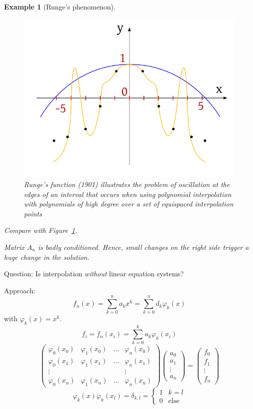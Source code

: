 \documentclass{article}
\newtheorem{example}{Example}
\begin{document}
\begin{example}[Runge's phenomenon]
  \begin{figure}[t]
    \begin{center}
      \includegraphics{img/01_runge_function.pdf}
      \caption{Runge's function (1901) illustrates the problem of oscillation at the edges of an interval that occurs when using polynomial interpolation with polynomials of high degree over a set of equispaced interpolation points}
      \label{img:runge}
    \end{center}
  \end{figure}

  Compare with Figure~\ref{img:runge}.

  Matrix $A_n$ is badly conditioned. Hence, small changes on the right side trigger a huge change in the solution.
\end{example}

Question: Is interpolation \emph{without} linear equation systems?


Approach:
\[ f_n(x) = \sum_{k=0}^n a_k x^k = \sum_{k=0}^n d_k \varphi_k(x) \]
with $\varphi_k(x) = x^k$.
\[ f_i = f_n(x_i) = \sum_{k=0}^k a_k \varphi_k(x_i) \]
\[
  \begin{pmatrix}
    \varphi_0(x_0) & \varphi_1(x_0) & \dots & \varphi_n(x_0) \\
    \varphi_0(x_1) & \varphi_1(x_1) & \dots & \varphi_n(x_1) \\
    \vdots & & & \vdots \\
    \varphi_0(x_n) & \varphi_1(x_n) & \dots & \varphi_n(x_n)
  \end{pmatrix}
  \begin{pmatrix}
    a_0 \\ a_1 \\ \vdots \\ a_n
  \end{pmatrix}
  =
  \begin{pmatrix}
    f_0 \\ f_1 \\ \vdots \\ f_n
  \end{pmatrix}
\]
\[ \varphi_k(x) \varphi_k(x_l) = \delta_{k,l} = \begin{cases} 1 & k=l \\ 0 & \text{else} \end{cases} \]
\end{document}
